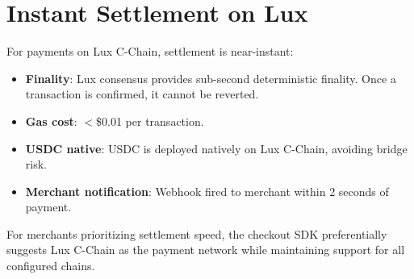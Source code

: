 \section{Instant Settlement on Lux}

\label{sec:lux}

For payments on Lux C-Chain, settlement is near-instant:

\begin{itemize}[leftmargin=1.4em]
    \item \textbf{Finality}: Lux consensus provides sub-second deterministic
    finality. Once a transaction is confirmed, it cannot be reverted.
    \item \textbf{Gas cost}: $<$\$0.01 per transaction.
    \item \textbf{USDC native}: USDC is deployed natively on Lux C-Chain,
    avoiding bridge risk.
    \item \textbf{Merchant notification}: Webhook fired to merchant
    within 2 seconds of payment.
\end{itemize}

For merchants prioritizing settlement speed, the checkout SDK
preferentially suggests Lux C-Chain as the payment network while
maintaining support for all configured chains.

